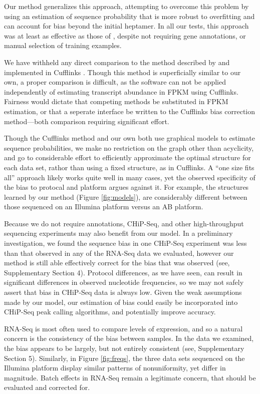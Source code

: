 \documentclass{bioinfo}
\begin{document}
Our method generalizes this approach, attempting to overcome this problem by
using an estimation of sequence probability that is more robust to overfitting
and can account for bias beyond the initial heptamer. In all our tests, this
approach was at least as effective as those of \citet{Li2010}, despite not
requiring gene annotations, or manual selection of training examples.

We have withheld any direct comparison to the method described by
\citet{Roberts2011} and implemented in Cufflinks \citep{Trapnell2010}. Though
this method is superficially similar to our own, a proper comparison is
difficult, as the software can not be applied independently of estimating
transcript abundance in FPKM using Cufflinks. Fairness would dictate that
competing methods be substituted in FPKM estimation, or that a seperate
interface be written to the Cufflinks bias correction method---both comparison
requiring significant effort.

Though the Cufflinks method and our own both use graphical models to estimate
sequence probabilities, we make no restriction on the graph other than
acyclicity, and go to considerable effort to efficiently approximate the optimal
structure for each data set, rathor than using a fixed structure, as in
Cufflinks. A ``one size fits all'' approach likely works quite well in many
cases, yet the observed specificity of the bias to protocal and platform argues
against it. For example, the structures learned by our method (Figure
\ref{fig:models}), are considerably different between those sequenced on an
Illumina platform versus an AB platform.



Because we do not require annotations, CHiP-Seq, and other high-throughput
sequencing experiments may also benefit from our model. In a preliminary
investigation, we found the sequence bias in one CHiP-Seq experiment
\cite{Cao2010} was less than that observed in any of the RNA-Seq data we
evaluated, however our method is still able effectively correct for the bias
that was observed (see, Supplementary Section 4).
Protocol differences, as we have seen,
can result in significant differences in observed nucleotide frequencies, so we
may not safely assert that bias in CHiP-Seq data is always low.  Given the weak
assumptions made by our model, our estimation of bias could easily be
incorporated into CHiP-Seq peak calling algorithms, and potentially improve
accuracy.

RNA-Seq is most often used to compare levels of expression, and so a natural
concern is the consistency of the bias between samples. In the data we examined,
the bias appears to be largely, but not entirely consistent (see,
Supplementary Section 5).
Similarly, in Figure \ref{fig:freqs}, the three data sets
sequenced on the Illumina platform display similar patterns of nonuniformity,
yet differ in magnitude. Batch effects in RNA-Seq remain a legitimate concern,
that should be evaluated and corrected for.




\end{document}
